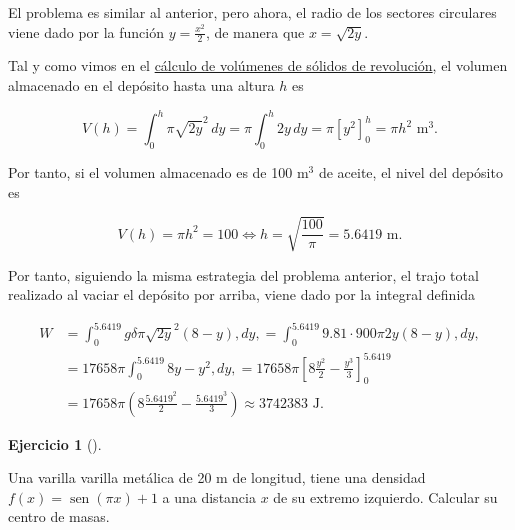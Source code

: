 \documentclass[
  spanish,
  a4paper,
]{scrreport}
\theoremstyle{definition}
\newtheorem{exercise}{Ejercicio}[chapter]
\theoremstyle{remark}
\begin{document}
\begin{tcolorbox}[enhanced jigsaw, arc=.35mm, bottomrule=.15mm, bottomtitle=1mm, breakable, colback=white, colbacktitle=quarto-callout-tip-color!10!white, colframe=quarto-callout-tip-color-frame, coltitle=black, left=2mm, leftrule=.75mm, opacityback=0, opacitybacktitle=0.6, rightrule=.15mm, title=\textcolor{quarto-callout-tip-color}{\faLightbulb}\hspace{0.5em}{Solución}, titlerule=0mm, toprule=.15mm, toptitle=1mm]

El problema es similar al anterior, pero ahora, el radio de los sectores
circulares viene dado por la función \(y=\frac{x^2}{2}\), de manera que
\(x=\sqrt{2y}\).

Tal y como vimos en el
\href{https://aprendeconalf.es/analisis-manual/08-integrales.html\#c\%C3\%A1lculo-de-vol\%C3\%BAmenes-de-s\%C3\%B3lidos-de-revoluci\%C3\%B3n}{cálculo
de volúmenes de sólidos de revolución}, el volumen almacenado en el
depósito hasta una altura \(h\) es

\[
V(h) = \int_0^h \pi \sqrt{2y}^2\,dy = \pi \int_0^h 2y\,dy = \pi [y^2]_0^h = \pi h^2 \mbox{ m}^3.
\]

Por tanto, si el volumen almacenado es de 100 m\(^3\) de aceite, el
nivel del depósito es

\[
V(h) = \pi h^2 = 100 \Leftrightarrow h = \sqrt{\frac{100}{\pi}} = 5.6419 \mbox{ m}.
\]

Por tanto, siguiendo la misma estrategia del problema anterior, el trajo
total realizado al vaciar el depósito por arriba, viene dado por la
integral definida

\begin{align*}
W 
&= \int_0^{5.6419} g\delta \pi \sqrt{2y}^2 (8-y) ,dy,
= \int_0^{5.6419} 9.81\cdot 900 \pi 2y (8-y) ,dy, \\
&= 17658\pi \int_0^{5.6419} 8y-y^2 ,dy,
= 17658\pi \left[8\frac{y^2}{2}-\frac{y^3}{3}\right]_0^{5.6419} \\
&= 17658\pi \left(8\frac{5.6419^2}{2}-\frac{5.6419^3}{3}\right)
\approx 3742383 \mbox{ J}.
\end{align*}

\end{tcolorbox}

\begin{exercise}[]\protect\hypertarget{exr-centro-masas-1}{}\label{exr-centro-masas-1}

Una varilla varilla metálica de 20 m de longitud, tiene una densidad
\(f(x)=\operatorname{sen}(\pi x)+1\) a una distancia \(x\) de su extremo
izquierdo. Calcular su centro de masas.

\end{exercise}
\end{document}
